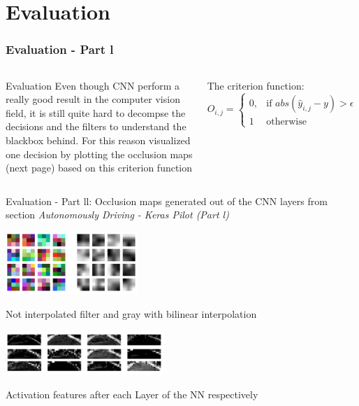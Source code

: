 \documentclass{beamer}
\begin{document}
\section{Evaluation}
\begin{frame}
\frametitle{Evaluation - Part l}
\begin{columns}[c] %
\begin{block}{Evaluation}
Even though CNN perform a really good result in the computer vision field, it is still quite hard to decompse the decisions and the filters to understand the blackbox behind. For this reason visualized one decision by plotting the occlusion maps (next page) based on this criterion function
\end{block}

The criterion function:
\begin{equation}
O_{i,j}= \begin{cases}
    0,& \text{if } abs(\hat{y}_{i,j} - y) > \epsilon\\
    1              & \text{otherwise} \end{cases}
\end{equation}
\end{columns}

\end{frame}

\begin{frame}
\begin{block}{Evaluation - Part ll: Occlusion maps generated out of the CNN layers from section \textit{Autonomously Driving - Keras Pilot (Part l)}}

\begin{center}
	\includegraphics[width=5cm]{photo/filter}
\end{center}
\begin{center}
Not interpolated filter and gray with bilinear interpolation
\end{center}

\begin{center}
	\includegraphics[width=6cm]{photo/activations}
\end{center}
\begin{center}
Activation features after each Layer of the NN respectively
\end{center}
\end{block}


\end{frame}
\end{document}
